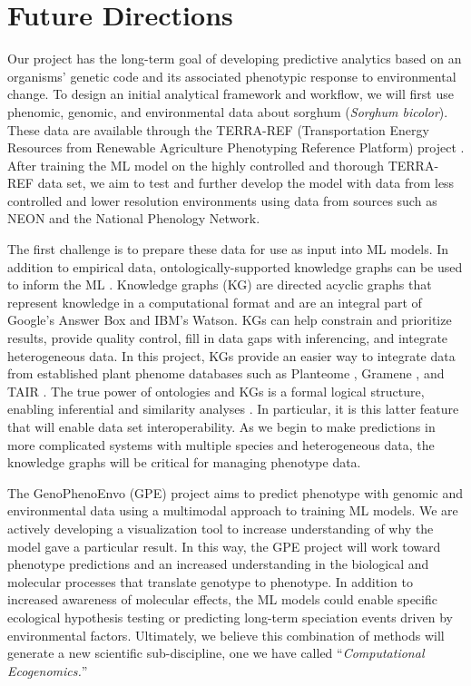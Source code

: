 \documentclass[11pt,]{article}
\begin{document}
\hypertarget{future-directions}{%
\section{Future Directions}\label{future-directions}}

Our project has the long-term goal of developing predictive analytics
based on an organisms' genetic code and its associated phenotypic
response to environmental change. To design an initial analytical
framework and workflow, we will first use phenomic, genomic, and
environmental data about sorghum (\emph{Sorghum bicolor}). These data
are available through the TERRA-REF (Transportation Energy Resources
from Renewable Agriculture Phenotyping Reference Platform) project
\citep{lebauer2020data, burnette2018terra}. After training the ML model
on the highly controlled and thorough TERRA-REF data set, we aim to test
and further develop the model with data from less controlled and lower
resolution environments using data from sources such as NEON and the
National Phenology Network.

The first challenge is to prepare these data for use as input into ML
models. In addition to empirical data, ontologically-supported knowledge
graphs can be used to inform the ML \citep{mungall2017monarch}.
Knowledge graphs (KG) are directed acyclic graphs that represent
knowledge in a computational format and are an integral part of Google's
Answer Box and IBM's Watson. KGs can help constrain and prioritize
results, provide quality control, fill in data gaps with inferencing,
and integrate heterogeneous data. In this project, KGs provide an easier
way to integrate data from established plant phenome databases such as
Planteome \citep{cooper2018planteome}, Gramene
\citep{jaiswalgramene2011}, and TAIR \citep{pooletair2007}. The true
power of ontologies and KGs is a formal logical structure, enabling
inferential and similarity analyses
\citep{mungall2017monarch, washington2009linking}. In particular, it is
this latter feature that will enable data set interoperability. As we
begin to make predictions in more complicated systems with multiple
species and heterogeneous data, the knowledge graphs will be critical
for managing phenotype data.

The GenoPhenoEnvo (GPE) project aims to predict phenotype with genomic
and environmental data using a multimodal approach to training ML
models. We are actively developing a visualization tool to increase
understanding of why the model gave a particular result. In this way,
the GPE project will work toward phenotype predictions and an increased
understanding in the biological and molecular processes that translate
genotype to phenotype. In addition to increased awareness of molecular
effects, the ML models could enable specific ecological hypothesis
testing or predicting long-term speciation events driven by
environmental factors. Ultimately, we believe this combination of
methods will generate a new scientific sub-discipline, one we have
called ``\emph{Computational Ecogenomics.}''
\end{document}
